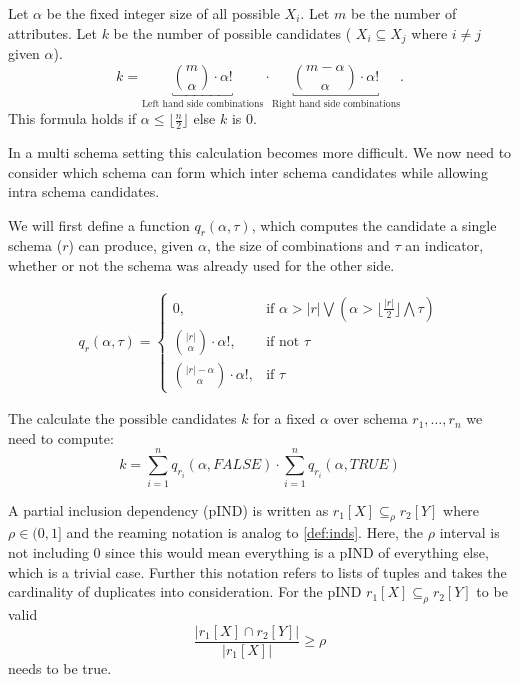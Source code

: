 \begin{definition}\label{def:candidates}
    Let $\alpha$ be the fixed integer size of all possible $X_i$. Let $m$ be the number of attributes. Let $k$ be the number of possible candidates ( $X_i \subseteq X_j$ where $i \not = j$ given $\alpha$).
    \[
        k = \underbracket{\binom{m}{\alpha}\cdot \alpha ! }_{\text{Left hand side combinations}} \cdot \underbracket{\binom{m-\alpha}{\alpha}\cdot \alpha!}_\text{Right hand side combinations}.
    \]
    This formula holds if $\alpha \leq \lfloor \frac{n}{2} \rfloor$ else $k$ is $0$.
\end{definition}
In a multi schema setting this calculation becomes more difficult. We now need to consider which schema can form which inter schema candidates while allowing intra schema candidates.
\begin{definition}\label{def:candidates-MS}
    We will first define a function $q_r(\alpha, \tau)$, which computes the candidate a single schema ($r$) can produce, given $\alpha$, the size of combinations and $\tau$ an indicator, whether or not the schema was already used for the other side.

    \begin{align*}
        q_r(\alpha, \tau) = \begin{cases}
            0, & \text{if } \alpha > |r| \bigvee (\alpha > \lfloor\frac{|r|}{2}\rfloor \bigwedge \tau)\\
            \binom{|r|}{\alpha}\cdot \alpha!, & \text{if not } \tau \\
            \binom{|r| - \alpha}{\alpha}\cdot \alpha!, & \text{if } \tau
        \end{cases}
    \end{align*}

    The calculate the possible candidates $k$ for a fixed $\alpha$ over schema $r_1, \dots, r_n$ we need to compute:
    $$
        k = \sum\limits_{i = 1}^n q_{r_i}(\alpha, FALSE) \cdot \sum\limits_{i = 1}^n q_{r_i}(\alpha, TRUE)
    $$
\end{definition}

\begin{definition}\label{def:pinds}
    A partial inclusion dependency (pIND) is written as $r_1[X] \subseteq_{\rho} r_2[Y]$ where $\rho \in (0, 1]$ and the reaming notation is analog to \ref{def:inds}. Here, the $\rho$ interval is not including $0$ since this would mean everything is a pIND of everything else, which is a trivial case. Further this notation refers to lists of tuples and takes the cardinality of duplicates into consideration. For the pIND $r_1[X] \subseteq_{\rho} r_2[Y]$ to be valid
    $$
        \frac{|r_1[X] \cap r_2[Y]|}
            {|r_1[X]|} \geq \rho
    $$
    needs to be true.
\end{definition}

